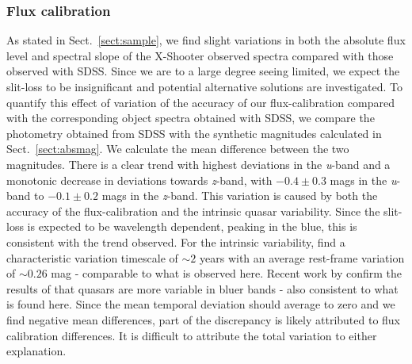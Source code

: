 \documentclass{aa}    %
\newcommand{\sectionname}{Sect.}
\newcommand{\Sect}[1]{\sectionname~\ref{sect:#1}}
\newcommand{\sect}[1]{\Sect{#1}}
\newcommand{\sectlabel}[1]{\label{sect:#1}}
\begin{document}
\subsubsection{Flux calibration}  \sectlabel{Flux calibration}
As stated in \sect{sample}, we find slight variations in both the
absolute flux level and spectral slope of the X-Shooter observed
spectra compared with those observed with SDSS. Since we are to a
large degree seeing limited, we expect the slit-loss to be
insignificant and potential alternative solutions are investigated. To
quantify this effect of variation of the accuracy of our
flux-calibration compared with the corresponding object spectra
obtained with SDSS, we compare the photometry obtained from SDSS with
the synthetic magnitudes calculated in \sect{absmag}. We calculate the
mean difference between the two magnitudes. There is a clear trend with highest
deviations in the
\textit{u}-band and a monotonic decrease in deviations towards
\textit{z}-band, with $-0.4 \pm 0.3$ mags in the \textit{u}-band to $-0.1
\pm 0.2$ mags in the \textit{z}-band. This variation is
caused by both the accuracy of the flux-calibration and the intrinsic
quasar variability. Since the slit-loss is expected to be wavelength
dependent, peaking in the blue, this is consistent with the trend
observed. For the intrinsic variability, \cite{MacLeod2012} find a
characteristic variation timescale of $\sim 2$ years with an average
rest-frame variation of $\sim 0.26$ mag - comparable to what is observed here.
Recent work
by \cite{Morganson2014} confirm the results of \cite{Helfand2001} that
quasars are more variable in bluer bands - also consistent to what is
found here. Since the mean temporal deviation should average to zero and we find
negative mean differences, part of the discrepancy is likely attributed to flux
calibration differences. It is difficult to attribute the total variation to
either explanation.


\end{document}
